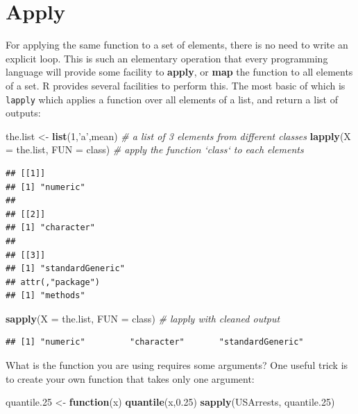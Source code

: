 \documentclass[]{book}
\newenvironment{Shaded}{\begin{snugshade}}{\end{snugshade}}
\newcommand{\KeywordTok}[1]{\textcolor[rgb]{0.13,0.29,0.53}{\textbf{#1}}}
\newcommand{\DataTypeTok}[1]{\textcolor[rgb]{0.13,0.29,0.53}{#1}}
\newcommand{\DecValTok}[1]{\textcolor[rgb]{0.00,0.00,0.81}{#1}}
\newcommand{\FloatTok}[1]{\textcolor[rgb]{0.00,0.00,0.81}{#1}}
\newcommand{\StringTok}[1]{\textcolor[rgb]{0.31,0.60,0.02}{#1}}
\newcommand{\CommentTok}[1]{\textcolor[rgb]{0.56,0.35,0.01}{\textit{#1}}}
\newcommand{\ControlFlowTok}[1]{\textcolor[rgb]{0.13,0.29,0.53}{\textbf{#1}}}
\newcommand{\NormalTok}[1]{#1}
\theoremstyle{definition}
\theoremstyle{definition}
\theoremstyle{definition}
\theoremstyle{remark}
\begin{document}
\section{Apply}\label{apply}

For applying the same function to a set of elements, there is no need to
write an explicit loop. This is such an elementary operation that every
programming language will provide some facility to \textbf{apply}, or
\textbf{map} the function to all elements of a set. R provides several
facilities to perform this. The most basic of which is \texttt{lapply}
which applies a function over all elements of a list, and return a list
of outputs:

\begin{Shaded}
\begin{Highlighting}[]
\NormalTok{the.list <-}\StringTok{ }\KeywordTok{list}\NormalTok{(}\DecValTok{1}\NormalTok{,}\StringTok{'a'}\NormalTok{,mean) }\CommentTok{# a list of 3 elements from different classes}
\KeywordTok{lapply}\NormalTok{(}\DataTypeTok{X =}\NormalTok{ the.list, }\DataTypeTok{FUN =}\NormalTok{ class) }\CommentTok{# apply the function `class` to each elements}
\end{Highlighting}
\end{Shaded}

\begin{verbatim}
## [[1]]
## [1] "numeric"
## 
## [[2]]
## [1] "character"
## 
## [[3]]
## [1] "standardGeneric"
## attr(,"package")
## [1] "methods"
\end{verbatim}

\begin{Shaded}
\begin{Highlighting}[]
\KeywordTok{sapply}\NormalTok{(}\DataTypeTok{X =}\NormalTok{ the.list, }\DataTypeTok{FUN =}\NormalTok{ class) }\CommentTok{# lapply with cleaned output}
\end{Highlighting}
\end{Shaded}

\begin{verbatim}
## [1] "numeric"         "character"       "standardGeneric"
\end{verbatim}

What is the function you are using requires some arguments? One useful
trick is to create your own function that takes only one argument:

\begin{Shaded}
\begin{Highlighting}[]
\NormalTok{quantile.}\DecValTok{25}\NormalTok{ <-}\StringTok{ }\ControlFlowTok{function}\NormalTok{(x) }\KeywordTok{quantile}\NormalTok{(x,}\FloatTok{0.25}\NormalTok{)}
\KeywordTok{sapply}\NormalTok{(USArrests, quantile.}\DecValTok{25}\NormalTok{)}
\end{Highlighting}
\end{Shaded}
\end{document}

